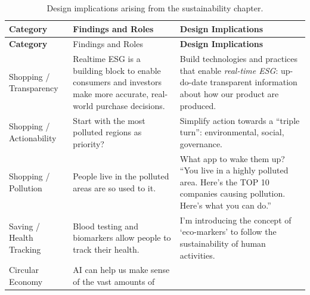 \documentclass[
  12pt,
  letterpaper,
  DIV=11,
  numbers=noendperiod]{scrartcl}
\begin{document}
\begin{longtable}[]{@{}
  >{\raggedright\arraybackslash}p{}
  >{\raggedright\arraybackslash}p{}
  >{\raggedright\arraybackslash}p{}@{}}
\caption{Design implications arising from the sustainability
chapter.}\tabularnewline
\toprule\noalign{}
\begin{minipage}[b]{\linewidth}\raggedright
\textbf{Category}
\end{minipage} & \begin{minipage}[b]{\linewidth}\raggedright
Findings and Roles
\end{minipage} & \begin{minipage}[b]{\linewidth}\raggedright
\textbf{Design Implications}
\end{minipage} \\
\midrule\noalign{}
\endfirsthead
\toprule\noalign{}
\begin{minipage}[b]{\linewidth}\raggedright
\textbf{Category}
\end{minipage} & \begin{minipage}[b]{\linewidth}\raggedright
Findings and Roles
\end{minipage} & \begin{minipage}[b]{\linewidth}\raggedright
\textbf{Design Implications}
\end{minipage} \\
\midrule\noalign{}
\endhead
\bottomrule\noalign{}
\endlastfoot
Shopping / Transparency & Realtime ESG is a building block to enable
consumers and investors make more accurate, real-world purchase
decisions. & Build technologies and practices that enable
\emph{real-time ESG}: up-do-date transparent information about how our
product are produced. \\
Shopping / Actionability & Start with the most polluted regions as
priority? & Simplify action towards a ``triple turn'': environmental,
social, governance. \\
Shopping / Pollution & People live in the polluted areas are so used to
it. & What app to wake them up? ``You live in a highly polluted area.
Here's the TOP 10 companies causing pollution. Here's what you can
do.'' \\
Saving / Health Tracking & Blood testing and biomarkers allow people to
track their health. & I'm introducing the concept of `eco-markers' to
follow the sustainability of human activities. \\
Circular Economy & AI can help us make sense of the vast amounts of

\end{longtable}
\end{document}
